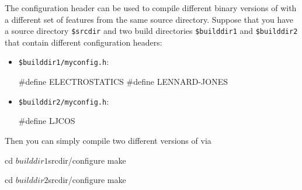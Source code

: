 The configuration header can be used to compile different binary
versions of \es with a different set of features from the same source
directory.  Suppose that you have a source directory \texttt{\$srcdir}
and two build directories \texttt{\$builddir1} and
\texttt{\$builddir2} that contain different configuration headers:

\begin{itemize}
\item \texttt{\$builddir1/myconfig.h}:
\begin{code}
#define ELECTROSTATICS
#define LENNARD-JONES
\end{code}

\item \texttt{\$builddir2/myconfig.h}:
\begin{code}
#define LJCOS
\end{code}
\end{itemize}

\noindent Then you can simply compile two different versions of \es via
\begin{code}
cd $builddir1
$srcdir/configure
make

cd $builddir2
$srcdir/configure
make
\end{code}


